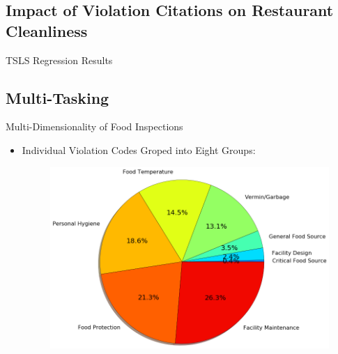 \documentclass[handout]{beamer}
\begin{document}
\fi

\subsection{Impact of Violation Citations on Restaurant Cleanliness}
\begin{frame}{TSLS Regression Results}
\begin{table}
\centering
\scalebox{0.6}{}
\end{table}

\end{frame}

\subsection{Multi-Tasking}
\begin{frame}{Multi-Dimensionality of Food Inspections}
    \begin{itemize}
    \item Individual Violation Codes Groped into Eight Groups: 
    \begin{figure}
        \centering
        \includegraphics[scale = 0.3]{viol_group_pie.png}
    \end{figure}
    \end{itemize}
\end{frame}
\end{document}
